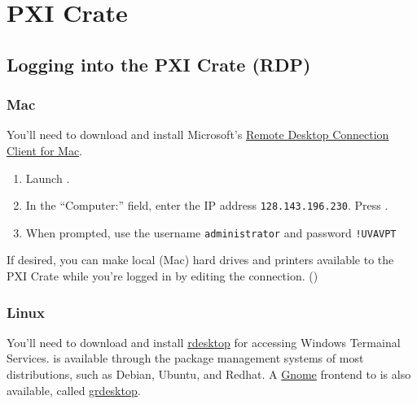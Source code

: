 \chapter{PXI Crate}
\label{sec:op_pxi}

\section{Logging into the PXI Crate (RDP)}
\label{sec:op_pxi:rdp}

\subsection{Mac}
\label{sec:op_pxi:rdp:mac}

You'll need to download and install Microsoft's \href{http://www.microsoft.com/mac/products/remote-desktop/default.mspx}{Remote Desktop Connection Client for Mac}.

\begin{enumerate}
\item Launch .
\item In the ``Computer:'' field, enter the IP address \texttt{128.143.196.230}.  Press .
\item When prompted, use the username \texttt{administrator} and password \texttt{!UVAVPT}
\end{enumerate}

If desired, you can make local (Mac) hard drives and printers available to the PXI Crate while you're logged in by editing the connection. ()

\subsection{Linux}
\label{sec:op_pxi:rdp:linux}

You'll need to download and install \href{http://www.rdesktop.org/}{rdesktop} for accessing Windows Termainal Services.   is available through the package management systems of most distributions, such as Debian, Ubuntu, and Redhat.  A \href{http://www.gnome.org/}{Gnome} frontend to  is also available, called \href{http://www.nongnu.org/grdesktop/}{grdesktop}.



